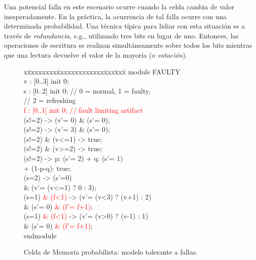 Una potencial falla en este escenario ocurre cuando la celda cambia de valor inesperadamente. %
En la práctica, la ocurrencia de tal falla ocurre con una determinada probabilidad. Una técnica típica para lidiar con esta situación es a través de \emph{redundancia}, %
e.g., utilizando tres bits en lugar de uno. Entonces, las operaciones de escritura se realizan simultáneamente sobre todos los bits mientras que una lectura devuelve el valor de la mayoría (o \emph{votación}).
\begin{figure}[t]
\centering
\begin{minipage}[t]{.47\textwidth}
\fontsize{10}{10}\selectfont\ttfamily
\begin{tabbing}
x\=xxxxxxxx\=xxxxxxxxxxxxx\=xxx\=xxx\= \kill    
module FAULTY\\[1ex]
\>v : [0..3] init 0;\\
\>s : [0..2] init 0; \>\>// 0 = normal, 1 = faulty,\\
\>                   \>\>// 2 = refreshing\\
\>\textcolor{red}{f : [0..1] init 0;} \>\>\textcolor{red}{// fault limiting artifact}\\[1ex]
\>[w0]    \>(s!=2)           \>\>-> \>(v'= 0) \& (s'= 0);\\
\>[w1]    \>(s!=2)           \>\>-> \>(v'= 3) \& (s'= 0);\\
\>[r0]    \>(s!=2) \& (v<=1) \>\>-> \>true;\\
\>[r1]    \>(s!=2) \& (v>=2) \>\>-> \>true;\\
\>[tick]  \>(s!=2)           \>\>-> \>p: (s'= 2) + q: (s'= 1) \\
\>        \>                 \>\>   \>+ (1-p-q): true;\\
\>[rfsh]  \>(s=2)            \>\>-> \>(s'=0)\\
\>        \>                 \>\>   \>\& (v'= (v<=1) ? 0 : 3);\\
\>[fault] \>(s=1) \textcolor{red}{\& (f<1)}   \>\>-> \>(v'= (v<3) ? (v+1) : 2) \\
\>        \>                 \>\>   \>\& (s'= 0) \textcolor{red}{\& (f'= f+1)};\\
\>[fault] \>(s=1) \textcolor{red}{\& (f<1)}    \>\>-> \>(v'= (v>0) ? (v-1) : 1) \\
\>        \>                 \>\>   \>\& (s'= 0) \textcolor{red}{\& (f'= f+1)};\\[1ex]
endmodule\\[-2em]
\end{tabbing}
 
\end{minipage}
\vspace{2ex}
\caption{Celda de Memoria probabilista: modelo tolerante a fallas.} \label{fig:exam_1_mem_cell:ft}
\end{figure}
%

